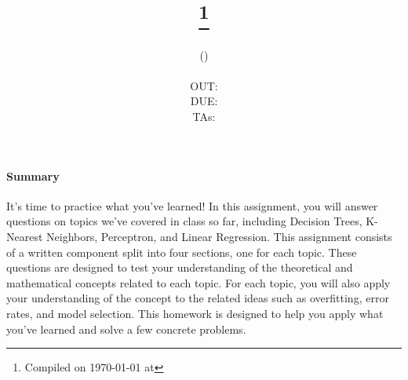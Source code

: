 \documentclass[11pt,addpoints,answers]{exam}
\title{\textsc{\hwNum}\\
\textsc{\hwTopic}
\thanks{Compiled on \today{} at \currenttime{}}\\
\vspace{1em}
} %
\author{\textsc{\large \courseNum{} \courseName{} (\courseSem)}\\
\courseUrl
\vspace{1em}\\
  OUT: \outDate \\
  DUE: \dueDate \\
  TAs: \taNames\\
}
\date{}
\date{}
\begin{document}
\maketitle 

\begin{notebox}
\paragraph{Summary} It's time to practice what you've learned! In this assignment, you will answer questions on topics we've covered in class so far, including Decision Trees, K-Nearest Neighbors, Perceptron, and Linear Regression. This assignment consists of a written component split into four sections, one for each topic. These questions are designed to test your understanding of the theoretical and mathematical concepts related to each topic. For each topic, you will also apply your understanding of the concept to the related ideas such as overfitting, error rates, and model selection. This homework is designed to help you apply what you've learned and solve a few concrete problems.
\end{notebox}\newcommand \maxsubs {10 }
\end{document}
